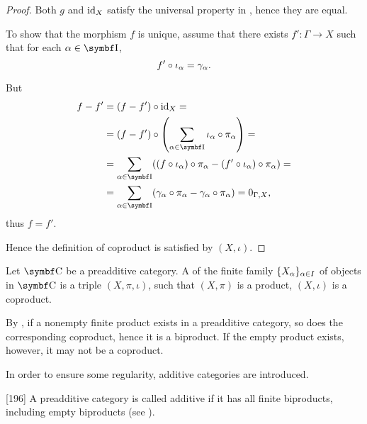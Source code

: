 \begin{proof}
  Both \( g \) and \( \operatorname{id}_X \) satisfy the universal property in , hence they are equal.

  To show that the morphism \( f \) is unique, assume that there exists \( f': \Gamma \to X \) such that for each \( \al \in \Cat{I} \),
  \begin{equation*}
    f' \circ \iota_\alpha = \gamma_\alpha.
  \end{equation*}

  But
  \begin{align*}
    f - f'
    &=
    (f - f') \circ \Id_X
    = \\ &=
    (f - f') \circ \left( \sum_{\al \in \Cat{I}} \iota_\al \circ \pi_\al \right)
    = \\ &=
    \sum_{\al \in \Cat{I}} ((f \circ \iota_\al) \circ \pi_\al - (f' \circ \iota_\al) \circ \pi_\al)
    = \\ &=
    \sum_{\al \in \Cat{I}} (\gamma_\al \circ \pi_\al - \gamma_\al \circ \pi_\al)
    =
    0_{\Gamma,X},
  \end{align*}
  thus \( f = f' \).

  Hence the definition of coproduct is satisfied by \( (X, \iota) \).
\end{proof}

\begin{definition}\label{def:categorical_biproduct}
  Let \( \Cat{C} \) be a preadditive category. A  of the finite family \( \{ X_\alpha \}_{\alpha \in I} \) of objects in \( \Cat{C} \) is a triple \( (X, \pi, \iota) \), such that \( (X, \pi) \) is a product, \( (X, \iota) \) is a coproduct.
\end{definition}

\begin{remark}\label{remark:preadditive_category_biproducts}
  By , if a nonempty finite product exists in a preadditive category, so does the corresponding coproduct, hence it is a biproduct. If the empty product exists, however, it may not be a coproduct.

  In order to ensure some regularity, additive categories are introduced.
\end{remark}

\begin{definition}\label{def:additive_category}\cite{MacLane1994}[196]
  A preadditive category is called additive if it has all finite biproducts, including empty biproducts (see ).
\end{definition}

